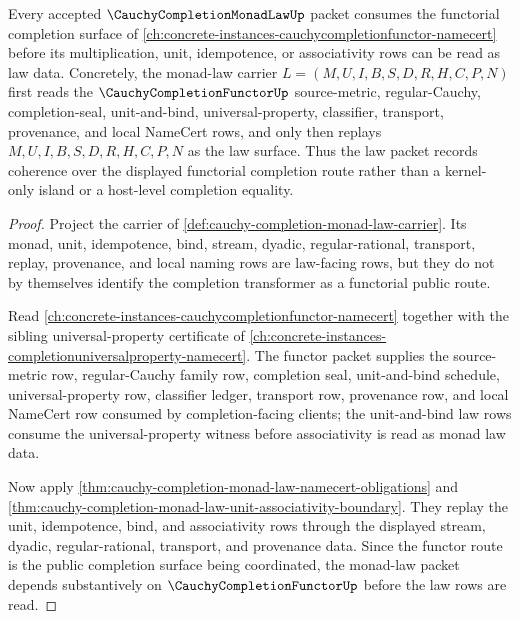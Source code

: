 \begin{theorem}
\label{thm:cauchy-completion-monad-law-functor-dependency-route}
Every accepted $\CauchyCompletionMonadLawUp$ packet consumes the functorial completion surface of \autoref{ch:concrete-instances-cauchycompletionfunctor-namecert} before its multiplication, unit, idempotence, or associativity rows can be read as law data. Concretely, the monad-law carrier $L=(M,U,I,B,S,D,R,H,C,P,N)$ first reads the $\CauchyCompletionFunctorUp$ source-metric, regular-Cauchy, completion-seal, unit-and-bind, universal-property, classifier, transport, provenance, and local NameCert rows, and only then replays $M,U,I,B,S,D,R,H,C,P,N$ as the law surface. Thus the law packet records coherence over the displayed functorial completion route rather than a kernel-only island or a host-level completion equality.
\end{theorem}
\begin{proof}
Project the carrier of \autoref{def:cauchy-completion-monad-law-carrier}. Its monad, unit, idempotence, bind, stream, dyadic, regular-rational, transport, replay, provenance, and local naming rows are law-facing rows, but they do not by themselves identify the completion transformer as a functorial public route.

Read \autoref{ch:concrete-instances-cauchycompletionfunctor-namecert} together with the sibling universal-property certificate of \autoref{ch:concrete-instances-completionuniversalproperty-namecert}. The functor packet supplies the source-metric row, regular-Cauchy family row, completion seal, unit-and-bind schedule, universal-property row, classifier ledger, transport row, provenance row, and local NameCert row consumed by completion-facing clients; the unit-and-bind law rows consume the universal-property witness before associativity is read as monad law data.

Now apply \autoref{thm:cauchy-completion-monad-law-namecert-obligations} and \autoref{thm:cauchy-completion-monad-law-unit-associativity-boundary}. They replay the unit, idempotence, bind, and associativity rows through the displayed stream, dyadic, regular-rational, transport, and provenance data. Since the functor route is the public completion surface being coordinated, the monad-law packet depends substantively on $\CauchyCompletionFunctorUp$ before the law rows are read.
\end{proof}
